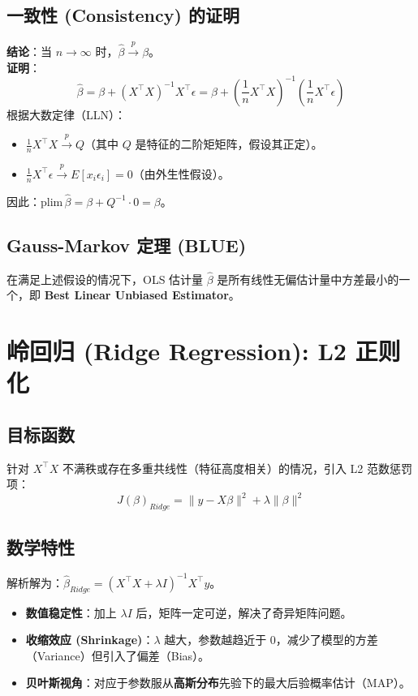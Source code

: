 \documentclass[12pt, a4paper]{article}
\begin{document}
\subsection{一致性 (Consistency) 的证明}
\textbf{结论}：当 $n \to \infty$ 时，$\hat{\beta} \xrightarrow{p} \beta$。
\\ \textbf{证明}：
$$ \hat{\beta} = \beta + (X^\top X)^{-1} X^\top \epsilon = \beta + \left( \frac{1}{n} X^\top X \right)^{-1} \left( \frac{1}{n} X^\top \epsilon \right) $$
根据大数定律（LLN）：
\begin{itemize}
    \item $\frac{1}{n} X^\top X \xrightarrow{p} Q$（其中 $Q$ 是特征的二阶矩矩阵，假设其正定）。
    \item $\frac{1}{n} X^\top \epsilon \xrightarrow{p} E[x_i \epsilon_i] = 0$（由外生性假设）。
\end{itemize}
因此：$\text{plim} \, \hat{\beta} = \beta + Q^{-1} \cdot 0 = \beta$。

\subsection{Gauss-Markov 定理 (BLUE)}
在满足上述假设的情况下，OLS 估计量 $\hat{\beta}$ 是所有线性无偏估计量中方差最小的一个，即 \textbf{Best Linear Unbiased Estimator}。

\section{岭回归 (Ridge Regression): L2 正则化}

\subsection{目标函数}
针对 $X^\top X$ 不满秩或存在多重共线性（特征高度相关）的情况，引入 L2 范数惩罚项：
$$ J(\beta)_{Ridge} = \|y - X\beta\|^2 + \lambda \|\beta\|^2 $$

\subsection{数学特性}
解析解为：$\hat{\beta}_{Ridge} = (X^\top X + \lambda I)^{-1} X^\top y$。
\begin{itemize}
    \item \textbf{数值稳定性}：加上 $\lambda I$ 后，矩阵一定可逆，解决了奇异矩阵问题。
    \item \textbf{收缩效应 (Shrinkage)}：$\lambda$ 越大，参数越趋近于 0，减少了模型的方差（Variance）但引入了偏差（Bias）。
    \item \textbf{贝叶斯视角}：对应于参数服从\textbf{高斯分布}先验下的最大后验概率估计（MAP）。
\end{itemize}
\end{document}
